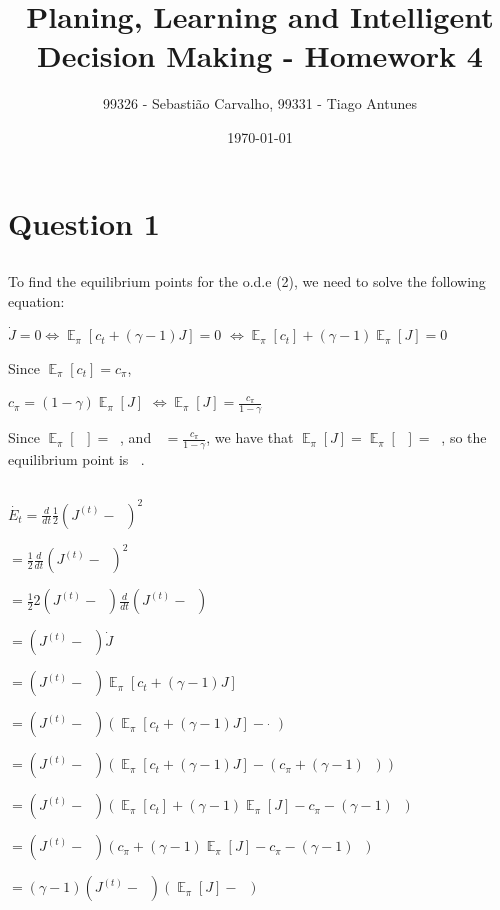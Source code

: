 \documentclass{article}
\title{Planing, Learning and Intelligent Decision Making - Homework 4}
\author{99326 - Sebastião Carvalho, 99331 - Tiago Antunes}
\date{\today}
\DeclareMathOperator{\EX}{\mathbb{E}}%
\DeclareMathOperator{\JPI}{J^\pi} %
\begin{document}
\maketitle

\tableofcontents

\section{Question 1}

\subsection{}

To find the equilibrium points for the o.d.e (2), we need to solve the following equation:

\medskip

$\dot{J} = 0 \Leftrightarrow \EX_\pi[c_t + (\gamma - 1) J] = 0$
$\Leftrightarrow \EX_\pi[c_t] + (\gamma - 1) \EX_\pi[J] = 0$

\medskip

Since $\EX_\pi[c_t] = c_\pi$, 

\medskip

$c_\pi = (1 - \gamma) \EX_\pi[J]$
$\Leftrightarrow \EX_\pi[J] = \frac{c_\pi}{1 - \gamma}$

\medskip

Since $\EX_\pi[\JPI] = \JPI$, and $\JPI = \frac{c_\pi}{1 - \gamma}$, we have that $\EX_\pi[J] = \EX_\pi[\JPI] = \JPI$,
so the equilibrium point is $\JPI$.

\subsection{}

$\dot{E_t} = \frac{d}{dt}  \frac{1}{2}  \left(J^{(t)} - \JPI \right)^2$

$ = \frac{1}{2}  \frac{d}{dt}  \left(J^{(t)} - \JPI \right)^2$

$ = \frac{1}{2}  2 \left(J^{(t)} - \JPI \right) \frac{d}{dt}  \left(J^{(t)} - \JPI \right)$

$ = \left(J^{(t)} - \JPI \right) \dot{J}$

$ = \left(J^{(t)} - \JPI \right) \EX_\pi[c_t + (\gamma - 1) J]$

$ = \left(J^{(t)} - \JPI \right) (\EX_\pi[c_t + (\gamma - 1) J] - \dot{\JPI})$

$ = \left(J^{(t)} - \JPI \right) (\EX_\pi[c_t + (\gamma - 1) J] - (c_\pi + (\gamma - 1) \JPI))$

$ = \left(J^{(t)} - \JPI \right) (\EX_\pi[c_t] + (\gamma - 1) \EX_\pi[J] - c_\pi - (\gamma - 1) \JPI)$

$ = \left(J^{(t)} - \JPI \right) (c_\pi +  (\gamma - 1) \EX_\pi[J] - c_\pi - (\gamma - 1) \JPI)$

$ = (\gamma - 1) \left(J^{(t)} - \JPI \right) (\EX_\pi[J] - \JPI)$
\subsection{}
\end{document}

